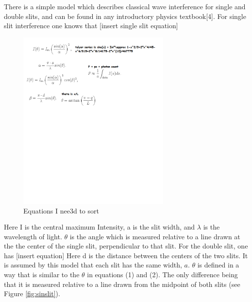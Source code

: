 \documentclass[12pt,twocolumn]{article}
\begin{document}
There is a simple model which describes classical wave interference for single
and double slits, and can be found in any introductory physics textbook[4]. For single slit
interference one knows that [insert single slit equation]

\begin{figure}[h!]
	\centering
	\label{fig:eq}
	\includegraphics[width=3in]{images/Equations}
	\caption{Equations I nee3d to sort}
\end{figure}

Here I is the central maximum Intensity, a is the slit width, and $\lambda$ is the wavelength of
light. $\theta$ is the angle which is measured relative to a line drawn at the the center of the
single slit, perpendicular to that slit.
For the double slit, one has [insert equation]
Here d is the distance between the centers of the two slits. It is assumed by this model that
each slit has the same width, $a$. $\theta$ is defined in a way that is similar to the $\theta$ in equations
(1) and (2). The only difference being that it is measured relative to a line drawn from the
midpoint of both slits (see Figure \ref{fig:sinslit}).
\end{document}
